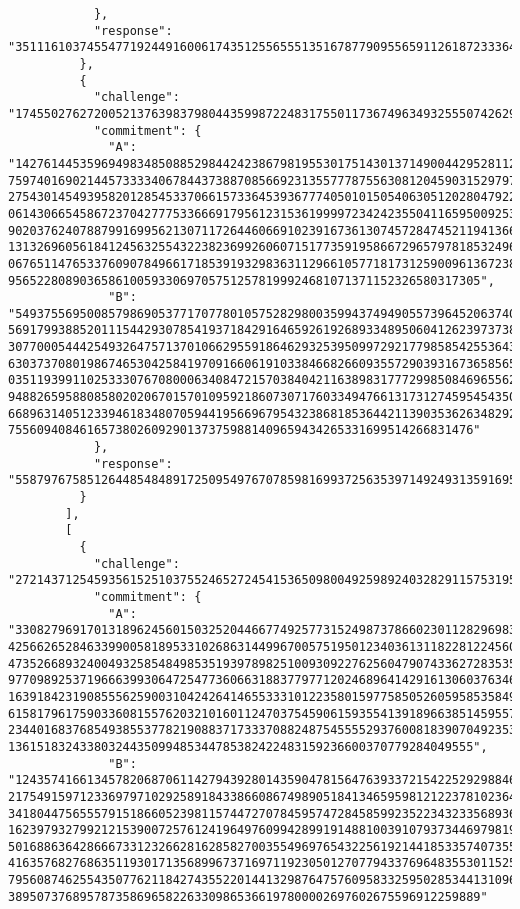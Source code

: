 \begin{lstlisting}
            },
            "response": "35111610374554771924491600617435125565551351678779095565911261872333649419481"
          },
          {
            "challenge": "17455027627200521376398379804435998722483175501173674963493255507426299982582",
            "commitment": {
              "A": "14276144535969498348508852984424238679819553017514301371490044295281127395468   7597401690214457333340678443738870856692313557778755630812045903152979708663636   2754301454939582012854533706615733645393677740501015054063051202804792215156681   0614306654586723704277753366691795612315361999972342423550411659500925356844239   9020376240788799169956213071172644606691023916736130745728474521194136660164541   1313269605618412456325543223823699260607151773591958667296579781853249641422722   0676511476533760907849661718539193298363112966105771817312590096136723849042526   956522808903658610059330697057512578199924681071371152326580317305",
              "B": "54937556950085798690537717077801057528298003599437494905573964520637406628771   5691799388520111544293078541937184291646592619268933489506041262397373880718307   3077000544425493264757137010662955918646293253950997292177985854255364326894624   6303737080198674653042584197091660619103384668266093557290393167365856534096874   0351193991102533307670800063408472157038404211638983177729985084696556241958814   9488265958808580202067015701095921860730717603349476613173127459545435055526957   6689631405123394618348070594419566967954323868185364421139035362634829286228714   75560940846165738026092901373759881409659434265331699514266831476"
            },
            "response": "55879767585126448548489172509549767078598169937256353971492493135916950997178"
          }
        ],
        [
          {
            "challenge": "27214371254593561525103755246527245415365098004925989240328291157531952501665",
            "commitment": {
              "A": "33082796917013189624560150325204466774925773152498737866023011282969831126584   4256626528463399005818953310268631449967005751950123403613118228122456065551588   4735266893240049325854849853519397898251009309227625604790743362728353543526226   9770989253719666399306472547736066318837797712024689641429161306037634646388611   1639184231908555625900310424264146553331012235801597758505260595853584956260424   6158179617590336081557620321016011247037545906159355413918966385145955730394800   2344016837685493855377821908837173337088248754555529376008183907049235363416563   13615183243380324435099485344785382422483159236600370779284049555",
              "B": "12435741661345782068706114279439280143590478156476393372154225292988460028855   2175491597123369797102925891843386608674989051841346595981212237810236491959166   3418044756555791518660523981157447270784595747284585992352234323356893654166704   1623979327992121539007257612419649760994289919148810039107937344697981991360066   5016886364286667331232662816285827003554969765432256192144185335740735557012081   4163576827686351193017135689967371697119230501270779433769648355301152523593938   7956087462554350776211842743552201441329876475760958332595028534413109600329696   389507376895787358696582263309865366197800002697602675596912259889"

\end{lstlisting}
